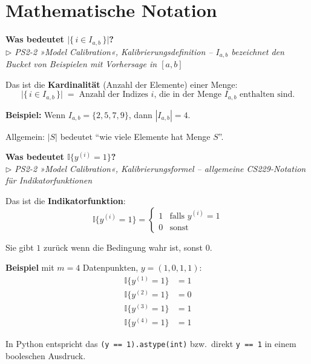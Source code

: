 \documentclass[11pt, a4paper]{article}
\newenvironment{frage}[2]{%
  \begin{tcolorbox}[frageboxstyle, title={Frage}]
  \textbf{#1}\\[3pt]
  {\small\itshape\color{black!55}\(\triangleright\) #2}
  \end{tcolorbox}
  \begin{tcolorbox}[antwortboxstyle]
}{%
  \end{tcolorbox}
  \vspace{4mm}
}
\begin{document}
\section{Mathematische Notation}

\begin{frage}{Was bedeutet $\bigl|\bigl\{\,i \in I_{a,b}\,\bigr\}\bigr|$?}{PS2-2 »Model Calibration«, Kalibrierungsdefinition -- $I_{a,b}$ bezeichnet den Bucket von Beispielen mit Vorhersage in $[a,b]$}

Das ist die \textbf{Kardinalität} (Anzahl der Elemente) einer Menge:
\[
  \bigl|\bigl\{\,i \in I_{a,b}\,\bigr\}\bigr|
  \;=\; \text{Anzahl der Indizes } i \text{, die in der Menge } I_{a,b} \text{ enthalten sind.}
\]

\textbf{Beispiel:} Wenn $I_{a,b} = \{2, 5, 7, 9\}$, dann $|I_{a,b}| = 4$.

Allgemein: $|S|$ bedeutet ``wie viele Elemente hat Menge $S$''.

\end{frage}

\begin{frage}{Was bedeutet $\mathbb{I}\bigl\{y^{(i)} = 1\bigr\}$?}{PS2-2 »Model Calibration«, Kalibrierungsformel -- allgemeine CS229-Notation für Indikatorfunktionen}

Das ist die \textbf{Indikatorfunktion}:
\[
  \mathbb{I}\bigl\{y^{(i)} = 1\bigr\}
  = \begin{cases}
      1 & \text{falls } y^{(i)} = 1 \\
      0 & \text{sonst}
    \end{cases}
\]

Sie gibt $1$ zurück wenn die Bedingung wahr ist, sonst $0$.

\textbf{Beispiel} mit $m=4$ Datenpunkten, $y = (1, 0, 1, 1)$:
\begin{align*}
  \mathbb{I}\{y^{(1)} = 1\} &= 1 \\
  \mathbb{I}\{y^{(2)} = 1\} &= 0 \\
  \mathbb{I}\{y^{(3)} = 1\} &= 1 \\
  \mathbb{I}\{y^{(4)} = 1\} &= 1
\end{align*}

In Python entspricht das \texttt{(y == 1).astype(int)} bzw.\ direkt \texttt{y == 1} in einem
booleschen Ausdruck.

\end{frage}
\end{document}
